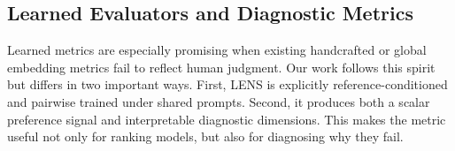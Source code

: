 \subsection{Learned Evaluators and Diagnostic Metrics}
Learned metrics are especially promising when existing handcrafted or global embedding metrics fail to reflect human judgment. Our work follows this spirit but differs in two important ways. First, LENS is explicitly reference-conditioned and pairwise trained under shared prompts. Second, it produces both a scalar preference signal and interpretable diagnostic dimensions. This makes the metric useful not only for ranking models, but also for diagnosing why they fail.
